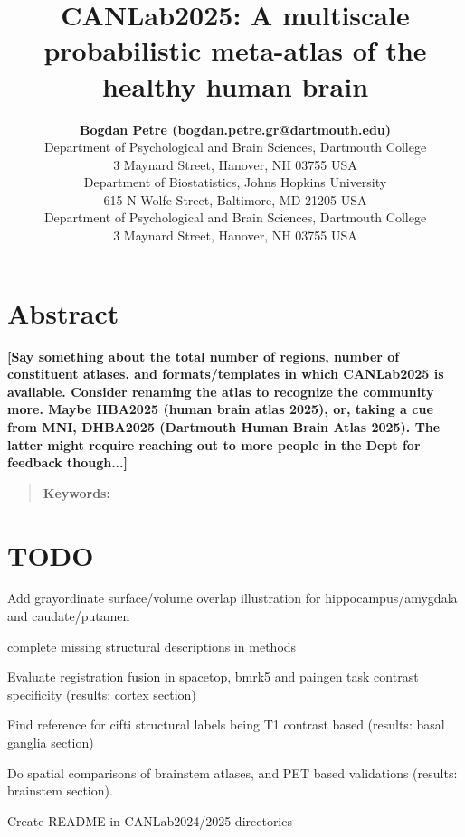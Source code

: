 \documentclass[10pt,letterpaper]{article}
\title{CANLab2025: A multiscale probabilistic meta-atlas of the healthy human brain}
\author{{\large \bf Bogdan Petre (bogdan.petre.gr@dartmouth.edu)} \\
  Department of Psychological and Brain Sciences, Dartmouth College \\
  3 Maynard Street, Hanover, NH 03755 USA
\AND {\large \bf Martin A Lindquist (mlindqui@jhsph.edu)} \\
  Department of Biostatistics, Johns Hopkins University \\
  615 N Wolfe Street, Baltimore, MD 21205 USA
\AND {\large \bf Tor D Wager (tor.d.wager@dartmouth.edu)} \\
  Department of Psychological and Brain Sciences, Dartmouth College \\
  3 Maynard Street, Hanover, NH 03755 USA}
\begin{document}
\maketitle

\section{Abstract}
{
\bf
[Say something about the total number of regions, number of constituent atlases, and formats/templates in which CANLab2025 is available. Consider renaming the atlas to recognize the community more. Maybe HBA2025 (human brain atlas 2025), or, taking a cue from MNI, DHBA2025 (Dartmouth Human Brain Atlas 2025). The latter might require reaching out to more people in the Dept for feedback though...]
}
\begin{quote}
\small
\textbf{Keywords:}
\end{quote}

\section{TODO}
Add grayordinate surface/volume overlap illustration for hippocampus/amygdala and caudate/putamen

complete missing structural descriptions in methods

Evaluate registration fusion in spacetop, bmrk5 and paingen task contrast specificity (results: cortex section)

Find reference for cifti structural labels being T1 contrast based (results: basal ganglia section)

Do spatial comparisons of brainstem atlases, and PET based validations (results: brainstem section).

Create README in CANLab2024/2025 directories
\end{document}
